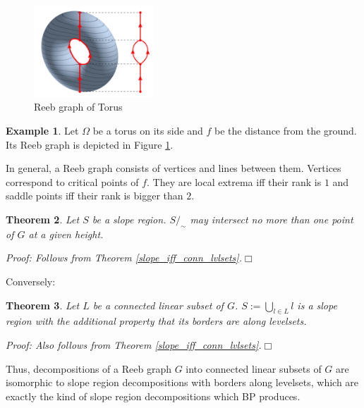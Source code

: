 \documentclass[a4paper,12pt,notitlepage,fullpage]{paper}
\theoremstyle{plain}
\newtheorem{thm}{Theorem}[section] %
\theoremstyle{definition}
\newtheorem{exmp}[thm]{Example} %
\begin{document}
\begin{figure}
\centering
\includegraphics[width=0.4\textwidth]{img/Reebgraph.png}
\caption{Reeb graph of Torus}
\label{fig:reeb_torus}
\end{figure}

\begin{exmp}
Let $\Omega$ be a torus on its side and $f$ be the distance from the ground. Its Reeb graph is depicted in Figure \ref{fig:reeb_torus}.
\end{exmp}

In general, a Reeb graph consists of vertices and lines between them. Vertices correspond to critical points of $f$. They are local extrema iff their rank is $1$ and saddle points iff their rank is bigger than $2$.

\begin{thm}
Let $S$ be a slope region. $S/_\sim$ may intersect no more than one point of $G$ at a given height.

\emph{Proof:} Follows from Theorem \ref{slope_iff_conn_lvlsets}.\hfill $\Box$
\end{thm}

Conversely:

\begin{thm}
Let $L$ be a connected linear subset of $G$. $S := \bigcup_{l \in L} l$ is a slope region with the additional property that its borders are along levelsets.

\emph{Proof:} Also follows from Theorem \ref{slope_iff_conn_lvlsets}.\hfill $\Box$
\end{thm}

Thus, decompositions of a Reeb graph $G$ into connected linear subsets of $G$ are isomorphic to slope region decompositions with borders along levelsets, which are exactly the kind of slope region decompositions which BP produces.
\end{document}
